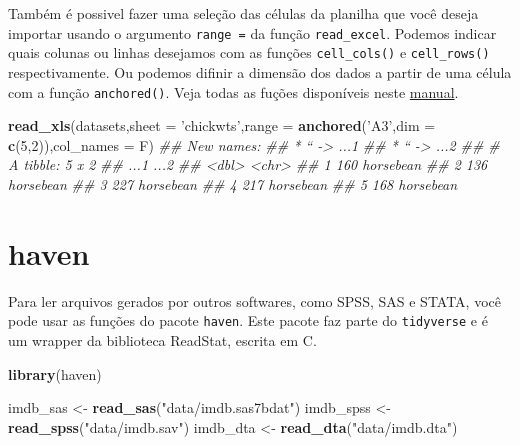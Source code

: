 \documentclass[]{book}
\newenvironment{Shaded}{\begin{snugshade}}{\end{snugshade}}
\newcommand{\CommentTok}[1]{\textcolor[rgb]{0.56,0.35,0.01}{\textit{#1}}}
\newcommand{\DataTypeTok}[1]{\textcolor[rgb]{0.13,0.29,0.53}{#1}}
\newcommand{\DecValTok}[1]{\textcolor[rgb]{0.00,0.00,0.81}{#1}}
\newcommand{\KeywordTok}[1]{\textcolor[rgb]{0.13,0.29,0.53}{\textbf{#1}}}
\newcommand{\NormalTok}[1]{#1}
\newcommand{\StringTok}[1]{\textcolor[rgb]{0.31,0.60,0.02}{#1}}
\begin{document}
Também é possivel fazer uma seleção das células da planilha que você deseja importar usando o argumento \texttt{range\ =} da função \texttt{read\_excel}. Podemos indicar quais colunas ou linhas desejamos com as funções \texttt{cell\_cols()} e \texttt{cell\_rows()} respectivamente. Ou podemos difinir a dimensão dos dados a partir de uma célula com a função \texttt{anchored()}. Veja todas as fuções disponíveis neste \href{https://cran.r-project.org/web/packages/cellranger/cellranger.pdf}{manual}.

\begin{Shaded}
\begin{Highlighting}[]
\KeywordTok{read_xls}\NormalTok{(datasets,}\DataTypeTok{sheet =} \StringTok{'chickwts'}\NormalTok{,}\DataTypeTok{range =} \KeywordTok{anchored}\NormalTok{(}\StringTok{'A3'}\NormalTok{,}\DataTypeTok{dim =} \KeywordTok{c}\NormalTok{(}\DecValTok{5}\NormalTok{,}\DecValTok{2}\NormalTok{)),}\DataTypeTok{col_names =}\NormalTok{ F)}
\CommentTok{## New names:}
\CommentTok{## * `` -> ...1}
\CommentTok{## * `` -> ...2}
\CommentTok{## # A tibble: 5 x 2}
\CommentTok{##    ...1 ...2     }
\CommentTok{##   <dbl> <chr>    }
\CommentTok{## 1   160 horsebean}
\CommentTok{## 2   136 horsebean}
\CommentTok{## 3   227 horsebean}
\CommentTok{## 4   217 horsebean}
\CommentTok{## 5   168 horsebean}
\end{Highlighting}
\end{Shaded}

\hypertarget{haven}{%
\section{haven}\label{haven}}

Para ler arquivos gerados por outros softwares, como SPSS, SAS e STATA, você pode usar as funções do pacote \texttt{haven}. Este pacote faz parte do \texttt{tidyverse} e é um wrapper da biblioteca ReadStat, escrita em C.

\begin{Shaded}
\begin{Highlighting}[]
\KeywordTok{library}\NormalTok{(haven)}

\NormalTok{imdb_sas <-}\StringTok{ }\KeywordTok{read_sas}\NormalTok{(}\StringTok{"data/imdb.sas7bdat"}\NormalTok{)}
\NormalTok{imdb_spss <-}\StringTok{ }\KeywordTok{read_spss}\NormalTok{(}\StringTok{"data/imdb.sav"}\NormalTok{)}
\NormalTok{imdb_dta <-}\StringTok{ }\KeywordTok{read_dta}\NormalTok{(}\StringTok{"data/imdb.dta"}\NormalTok{)}
\end{Highlighting}
\end{Shaded}
\end{document}
